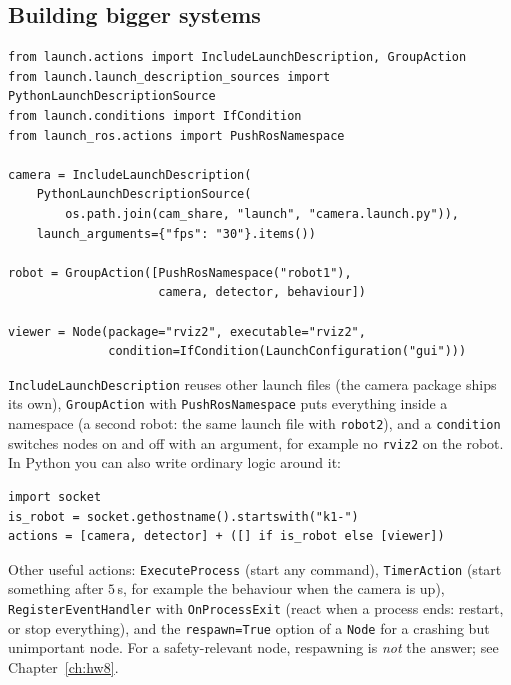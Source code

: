 \subsection*{Building bigger systems}
\begin{verbatim}
from launch.actions import IncludeLaunchDescription, GroupAction
from launch.launch_description_sources import PythonLaunchDescriptionSource
from launch.conditions import IfCondition
from launch_ros.actions import PushRosNamespace

camera = IncludeLaunchDescription(
    PythonLaunchDescriptionSource(
        os.path.join(cam_share, "launch", "camera.launch.py")),
    launch_arguments={"fps": "30"}.items())

robot = GroupAction([PushRosNamespace("robot1"),
                     camera, detector, behaviour])

viewer = Node(package="rviz2", executable="rviz2",
              condition=IfCondition(LaunchConfiguration("gui")))
\end{verbatim}
\verb!IncludeLaunchDescription! reuses other launch files (the camera package ships its own), \verb!GroupAction! with \verb!PushRosNamespace! puts everything inside a namespace (a second robot: the same launch file with \verb!robot2!), and a \verb!condition! switches nodes on and off with an argument, for example no \verb!rviz2! on the robot. In Python you can also write ordinary logic around it:
\begin{verbatim}
import socket
is_robot = socket.gethostname().startswith("k1-")
actions = [camera, detector] + ([] if is_robot else [viewer])
\end{verbatim}
Other useful actions: \verb!ExecuteProcess! (start any command), \verb!TimerAction! (start something after $5$\,s, for example the behaviour when the camera is up), \verb!RegisterEventHandler! with \verb!OnProcessExit! (react when a process ends: restart, or stop everything), and the \verb!respawn=True! option of a \verb!Node! for a crashing but unimportant node. For a safety-relevant node, respawning is \emph{not} the answer; see Chapter~\ref{ch:hw8}.

